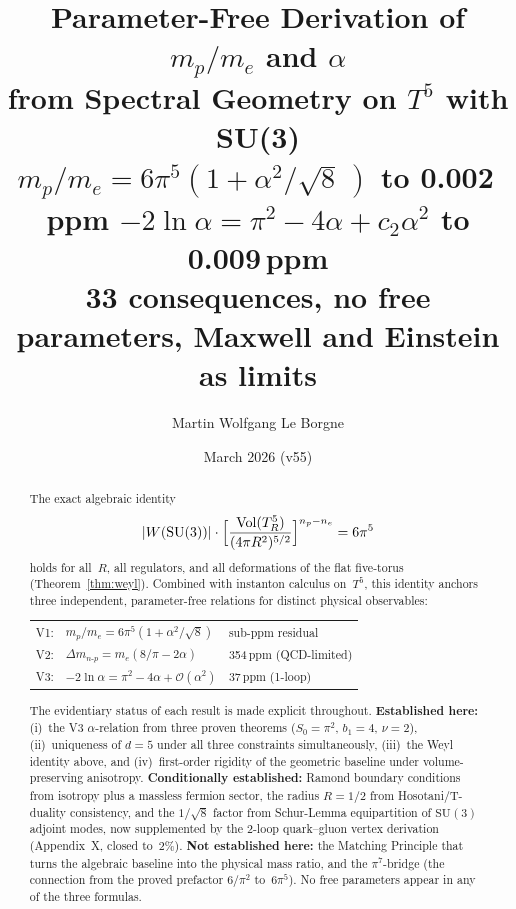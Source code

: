 \documentclass[11pt,a4paper]{article}
\title{\vspace{-1em}\textbf{Parameter-Free Derivation of $m_p/m_e$ and $\alpha$\\
    from Spectral Geometry on $T^5$ with SU(3)}\\[0.4em]
  \large $m_p/m_e=6\pi^5(1{+}\alpha^2/\!\sqrt{8}\,)$ to 0.002\,ppm\quad
  $-2\ln\alpha=\pi^2{-}4\alpha{+}c_2\alpha^2$ to 0.009\,ppm\\[0.2em]
  \large 33 consequences, no free parameters, Maxwell and Einstein as limits}
\author{Martin Wolfgang Le Borgne}
\date{March 2026 (v55)}
\theoremstyle{definition}
\theoremstyle{remark}
\begin{document}
\maketitle
\thispagestyle{fancy}

\begin{abstract}
The exact algebraic identity
\[
  |W(\mathrm{SU}(3))|\cdot
  \Bigl[\frac{\mathrm{Vol}(T^5_R)}{(4\pi R^2)^{5/2}}\Bigr]^{n_p-n_e}
  = 6\pi^5
\]
holds for all~$R$, all regulators, and all deformations of the flat
five-torus (Theorem~\ref{thm:weyl}).  Combined with instanton calculus
on~$T^5$, this identity anchors three independent, parameter-free
relations for distinct physical observables:
\begin{center}
\renewcommand{\arraystretch}{1.05}
\begin{tabular}{lll}
V1: & $m_p/m_e = 6\pi^5(1+\alpha^2/\sqrt{8})$ & sub-ppm residual\\
V2: & $\Delta m_{n\mbox{-}p} = m_e(8/\pi-2\alpha)$ & 354\,ppm (QCD-limited)\\
V3: & $-2\ln\alpha = \pi^2-4\alpha+\mathcal{O}(\alpha^2)$ & 37\,ppm (1-loop)
\end{tabular}
\end{center}

The evidentiary status of each result is made explicit throughout.
\textbf{Established here:}
(i)~the V3 \texorpdfstring{$\alpha$}{alpha}-relation from three proven theorems ($S_0=\pi^2$,
$b_1=4$, $\nu=2$),
(ii)~uniqueness of $d=5$ under all three constraints simultaneously,
(iii)~the Weyl identity above, and
(iv)~first-order rigidity of the geometric baseline under
volume-preserving anisotropy.
\textbf{Conditionally established:}
Ramond boundary conditions from isotropy plus a massless fermion sector,
the radius $R=1/2$ from Hosotani/T-duality consistency, and the
$1/\sqrt{8}$ factor from Schur-Lemma equipartition of $\mathrm{SU}(3)$
adjoint modes, now supplemented by the 2-loop quark--gluon vertex
derivation (Appendix~X, closed to~$2\%$).
\textbf{Not established here:}
the Matching Principle that turns the algebraic
baseline into the physical mass ratio, and the $\pi^7$-bridge (the connection from the
proved prefactor $6/\pi^2$ to~$6\pi^5$).
No free parameters appear in any of the three formulas.
\end{abstract}

\end{document}
